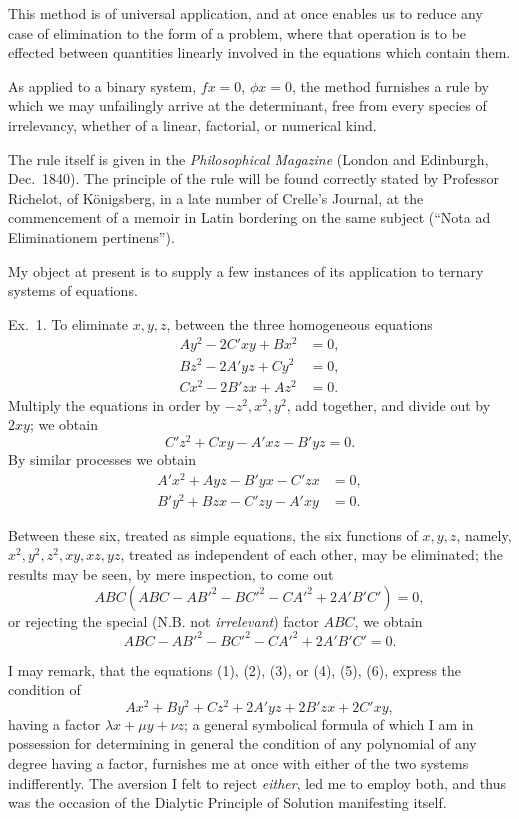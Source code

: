 \documentclass[11pt]{article}
\newcommand{\sourcepage}[1]{\marginpar{\scriptsize p.~#1}}
\begin{document}
\sourcepage{61}
This method is of universal application, and at once enables us to reduce any case of elimination to the form of a problem, where that operation is to be effected between quantities linearly involved in the equations which contain them.

As applied to a binary system, $fx=0$, $\phi x=0$, the method furnishes a rule by which we may unfailingly arrive at the determinant, free from every species of irrelevancy, whether of a linear, factorial, or numerical kind.

The rule itself is given in the \emph{Philosophical Magazine} (London and Edinburgh, Dec.~1840). The principle of the rule will be found correctly stated by Professor Richelot, of K\"onigsberg, in a late number of Crelle's Journal, at the commencement of a memoir in Latin bordering on the same subject (``Nota ad Eliminationem pertinens'').

My object at present is to supply a few instances of its application to ternary systems of equations.

\medskip
\noindent Ex.~1. \quad To eliminate $x,y,z$, between the three homogeneous equations
\begin{align}
 A y^2-2C'xy+B x^2&=0,\tag{1}\\
 B z^2-2A'yz+C y^2&=0,\tag{2}\\
 C x^2-2B'zx+A z^2&=0.\tag{3}
\end{align}
Multiply the equations in order by $-z^2,x^2,y^2$, add together, and divide out by $2xy$; we obtain
\begin{equation}
 C' z^2+Cxy-A'xz-B'yz=0.\tag{4}
\end{equation}
By similar processes we obtain
\begin{align}
 A' x^2+Ayz-B'yx-C'zx&=0,\tag{5}\\
 B' y^2+Bzx-C'zy-A'xy&=0.\tag{6}
\end{align}

\sourcepage{62}
Between these six, treated as simple equations, the six functions of $x,y,z$, namely, $x^2,y^2,z^2,xy,xz,yz$, treated as independent of each other, may be eliminated; the results may be seen, by mere inspection, to come out
\[
ABC(ABC-AB'^2-BC'^2-CA'^2+2A'B'C')=0,
\]
or rejecting the special (N.B. not \emph{irrelevant}) factor $ABC$, we obtain
\[
ABC-AB'^2-BC'^2-CA'^2+2A'B'C'=0.
\]

I may remark, that the equations (1), (2), (3), or (4), (5), (6), express the condition of
\[
Ax^2+By^2+Cz^2+2A'yz+2B'zx+2C'xy,
\]
having a factor $\lambda x+\mu y+\nu z$; a general symbolical formula of which I am in possession for determining in general the condition of any polynomial of any degree having a factor, furnishes me at once with either of the two systems indifferently. The aversion I felt to reject \emph{either}, led me to employ both, and thus was the occasion of the Dialytic Principle of Solution manifesting itself.
\end{document}
